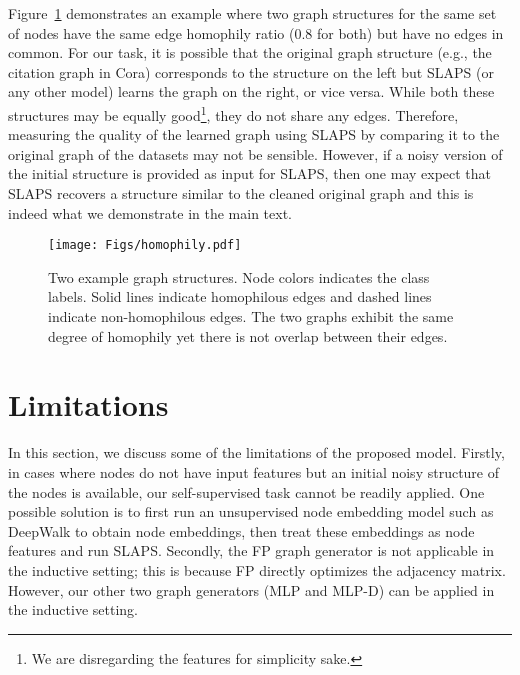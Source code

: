 \documentclass{article}
\begin{document}
Figure~\ref{fig:homophily} demonstrates an example where two graph structures for the same set of nodes have the same edge homophily ratio (0.8 for both) but have no edges in common. For our task, it is possible that the original graph structure (e.g., the citation graph in Cora) corresponds to the structure on the left but SLAPS (or any other model) learns the graph on the right, or vice versa. While both these structures may be equally good\footnote{We are disregarding the features for simplicity sake.}, they do not share any edges. Therefore, measuring the quality of the learned graph using SLAPS by comparing it to the original graph of the datasets may not be sensible. However, if a noisy version of the initial structure is provided as input for SLAPS, then one may expect that SLAPS recovers a structure similar to the cleaned original graph and this is indeed what we demonstrate in the main text.

\begin{figure}[t]
   \texttt{[image: Figs/homophily.pdf]}
   \caption{\label{fig:homophily} Two example graph structures. Node colors indicates the class labels. Solid lines indicate homophilous edges and dashed lines indicate non-homophilous edges. The two graphs exhibit the same degree of homophily yet there is not overlap between their edges.
   }
\end{figure}

\section{Limitations}
In this section, we discuss some of the limitations of the proposed model. Firstly, in cases where nodes do not have input features but an initial noisy structure of the nodes is available, our self-supervised task cannot be readily applied. One possible solution is to first run an unsupervised node embedding model such as DeepWalk \cite{perozzi2014deepwalk} to obtain node embeddings, then treat these embeddings as node features and run SLAPS. 
Secondly, the FP graph generator is not applicable in the inductive setting; this is because FP directly optimizes the adjacency matrix. However, our other two graph generators (MLP and MLP-D) can be applied in the inductive setting.
\end{document}
